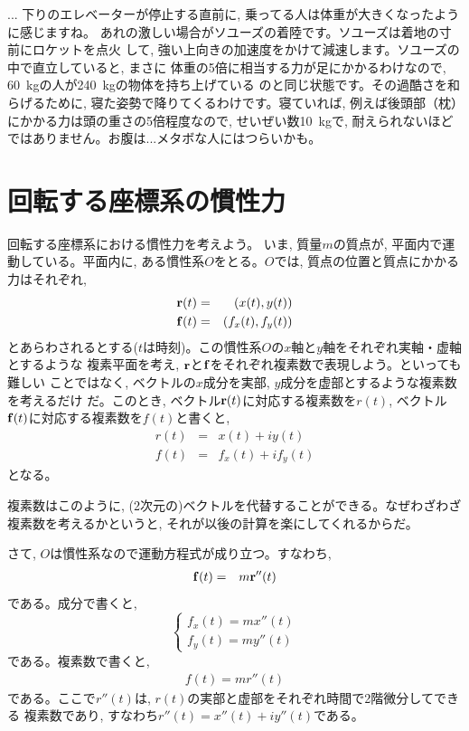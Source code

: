 \begin{faq}{\small{} ... 
下りのエレベーターが停止する直前に, 乗ってる人は体重が大きくなったように感じますね。
あれの激しい場合がソユーズの着陸です。ソユーズは着地の寸前にロケットを点火
して, 強い上向きの加速度をかけて減速します。ソユーズの中で直立していると, まさに
体重の5倍に相当する力が足にかかるわけなので, 60~kgの人が240~kgの物体を持ち上げている
のと同じ状態です。その過酷さを和らげるために, 寝た姿勢で降りてくるわけです。寝ていれば, 
例えば後頭部（枕）にかかる力は頭の重さの5倍程度なので, せいぜい数10~kgで, 
耐えられないほどではありません。お腹は...メタボな人にはつらいかも。
}\end{faq}\hv


\section{回転する座標系の慣性力}

回転する座標系における慣性力を考えよう。
いま, 質量$m$の質点が, 平面内で運動している。平面内に, ある慣性系$O$をとる。$O$では, 
質点の位置と質点にかかる力はそれぞれ, 
\begin{eqnarray}
{\bf r}(t)&=&(x(t), y(t))\\
{\bf f}(t)&=&(f_x(t), f_y(t))
\end{eqnarray}
とあらわされるとする($t$は時刻)。この慣性系$O$の$x$軸と$y$軸をそれぞれ実軸・虚軸とするような
複素平面を考え, ${\bf r}$と${\bf f}$をそれぞれ複素数で表現しよう。といっても難しい
ことではなく, ベクトルの$x$成分を実部, $y$成分を虚部とするような複素数を考えるだけ
だ。このとき, ベクトル${\bf r}(t)$に対応する複素数を$r(t)$, 
ベクトル${\bf f}(t)$に対応する複素数を$f(t)$と書くと, 
\begin{eqnarray}
r(t)&=&x(t)+iy(t)\\
f(t)&=&f_x(t)+if_y(t)
\end{eqnarray}
となる。

複素数はこのように, (2次元の)ベクトルを代替することができる。なぜわざわざ
複素数を考えるかというと, それが以後の計算を楽にしてくれるからだ。

さて, $O$は慣性系なので運動方程式が成り立つ。すなわち, 
\begin{eqnarray}
{\bf f}(t)&=&m{\bf r}''(t)
\end{eqnarray}
である。成分で書くと, 
\begin{equation}\begin{cases}
f_x(t)=mx''(t)\\
f_y(t)=my''(t)
\end{cases}\end{equation}
である。複素数で書くと, 
\begin{eqnarray}
f(t)=mr''(t)
\end{eqnarray}
である。ここで$r''(t)$は, $r(t)$の実部と虚部をそれぞれ時間で2階微分してできる
複素数であり, すなわち$r''(t)=x''(t)+iy''(t)$である。\mv

